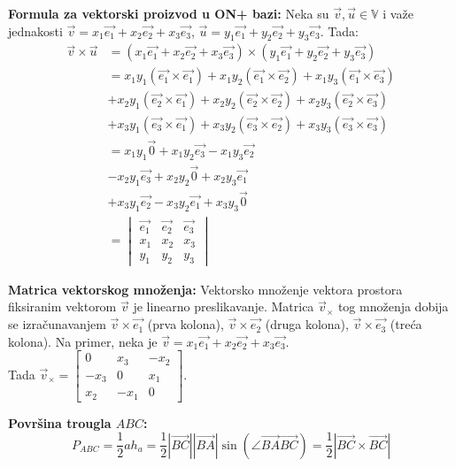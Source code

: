 \documentclass[12pt]{article}
\newcommand{\vek}[1]{\overrightarrow{#1}}
\begin{document}
\textbf{Formula za vektorski proizvod u ON+ bazi:} Neka su $\vek{v},\vek{u}\in
    \mathbb{V}$ i važe jednakosti
$\vek{v}=x_1\vek{e_1}+x_2\vek{e_2}+x_3\vek{e_3}$, $\vek{u}=
    y_1\vek{e_1}+y_2\vek{e_2}+y_3\vek{e_3}$. Tada:
\begin{align*}
    \vek{v}\times\vek{u} & = (x_1\vek{e_1}+x_2\vek{e_2}+x_3\vek{e_3})
    \times(y_1\vek{e_1}+y_2\vek{e_2}+y_3\vek{e_3})                        \\
                         & =x_1y_1(\vek{e_1}\times\vek{e_1})+x_1y_2
    (\vek{e_1}\times\vek{e_2})+x_1y_3(\vek{e_1}\times\vek{e_3})           \\
                         & +x_2y_1(\vek{e_2}\times\vek{e_1})+x_2y_2
    (\vek{e_2}\times\vek{e_2})+x_2y_3(\vek{e_2}\times\vek{e_3})           \\
                         & +x_3y_1(\vek{e_3}\times\vek{e_1})+x_3y_2
    (\vek{e_3}\times\vek{e_2})+x_3y_3(\vek{e_3}\times\vek{e_3})           \\
                         & =x_1y_1\vek{0}+x_1y_2\vek{e_3}-x_1y_3\vek{e_2} \\
                         & -x_2y_1\vek{e_3}+x_2y_2\vek{0}+x_2y_3\vek{e_1} \\
                         & +x_3y_1\vek{e_2}-x_3y_2\vek{e_1}+x_3y_3\vek{0} \\
                         & = \begin{vmatrix}
                                 \vek{e_1} & \vek{e_2} & \vek{e_3} \\
                                 x_1       & x_2       & x_3       \\
                                 y_1       & y_2       & y_3
                             \end{vmatrix}
\end{align*}
\par

\textbf{Matrica vektorskog množenja:} Vektorsko množenje vektora prostora
fiksiranim vektorom $\vek{v}$ je linearno preslikavanje.
Matrica $\vek{v}_\times$ tog množenja dobija se izračunavanjem
$\vek{v}\times\vek{e_1}$ (prva kolona), $\vek{v}\times\vek{e_2}$
(druga kolona), $\vek{v}\times\vek{e_3}$ (treća kolona). Na primer,
neka je $\vek{v}=x_1\vek{e_1}+x_2\vek{e_2}+x_3\vek{e_3}$.\\
Tada  $\vek{v}_\times=
    \begin{bmatrix}
        0    & x_3  & -x_2 \\
        -x_3 & 0    & x_1  \\
        x_2  & -x_1 & 0
    \end{bmatrix}$.
\par
\textbf{Površina trougla $ABC$:}
$$P_{ABC}=\frac{1}{2}ah_a=\frac{1}{2} |\vek{BC}||\vek{BA}|
    \sin(\angle{\vek{BA}\vek{BC}})=\frac{1}{2} |\vek{BC}\times\vek{BC}|$$
\par
\end{document}
